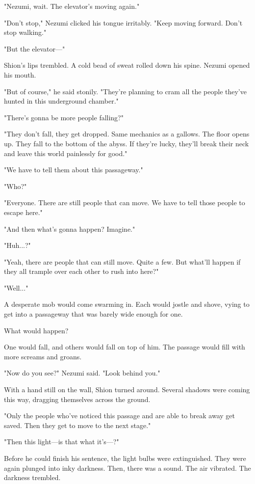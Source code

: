 "Nezumi, wait. The elevator's moving again."

"Don't stop," Nezumi clicked his tongue irritably. "Keep moving forward.
Don't stop walking."

"But the elevator---"

Shion's lips trembled. A cold bead of sweat rolled down his spine.
Nezumi opened his mouth.

"But of course," he said stonily. "They're planning to cram all the
people they've hunted in this underground chamber."

"There's gonna be more people falling?"

"They don't fall, they get dropped. Same mechanics as a gallows. The
floor opens up. They fall to the bottom of the abyss. If they're lucky,
they'll break their neck and leave this world painlessly for good."

"We have to tell them about this passageway."

"Who?"

"Everyone. There are still people that can move. We have to tell those
people to escape here."

"And then what's gonna happen? Imagine."

"Huh...?"

"Yeah, there are people that can still move. Quite a few. But what'll
happen if they all trample over each other to rush into here?"

"Well..."

A desperate mob would come swarming in. Each would jostle and shove,
vying to get into a passageway that was barely wide enough for one.

What would happen?

One would fall, and others would fall on top of him. The passage would
fill with more screams and groans.

"Now do you see?" Nezumi said. "Look behind you."

With a hand still on the wall, Shion turned around. Several shadows were
coming this way, dragging themselves across the ground.

"Only the people who've noticed this passage and are able to break away
get saved. Then they get to move to the next stage."

"Then this light---is that what it's---?"

Before he could finish his sentence, the light bulbs were extinguished.
They were again plunged into inky darkness. Then, there was a sound. The
air vibrated. The darkness trembled.

